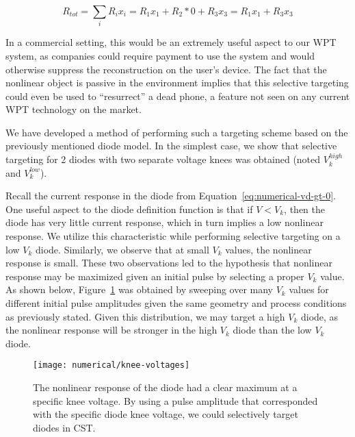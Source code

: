 \begin{equation}
R_{tot} = \sum_{i}R_{i}x_{i} = R_{1}x_{1} + R_{2}*0 + R_{3}x_{3} = R_{1}x_{1} + R_{3}x_{3}
\label{eq:numerical-r-tot-2}
\end{equation}

In a commercial setting, this would be an extremely useful aspect to our WPT system, as companies could require payment to use the system and would otherwise suppress the reconstruction on the user's device. The fact that the nonlinear object is passive in the environment implies that this selective targeting could even be used to ``resurrect'' a dead phone, a feature not seen on any current WPT technology on the market.

We have developed a method of performing such a targeting scheme based on the previously mentioned diode model. In the simplest case, we show that selective targeting for 2 diodes with two separate voltage knees was obtained (noted $V_k^{high}$ and $V_k^{low}$).

Recall the current response in the diode from Equation~\ref{eq:numerical-vd-gt-0}. One useful aspect to the diode definition function is that if $V < V_{k}$, then the diode has very little current response, which in turn implies a low nonlinear response. We utilize this characteristic while performing selective targeting on a low $V_{k}$ diode. Similarly, we observe that at small $V_{k}$ values, the nonlinear response is small. These two observations led to the hypothesis that nonlinear response may be maximized given an initial pulse by selecting a proper $V_{k}$ value. As shown below, Figure~\ref{fig:numerical-knee-voltages} was obtained by sweeping over many $V_{k}$ values for different initial pulse amplitudes given the same geometry and process conditions as previously stated. Given this distribution, we may target a high $V_{k}$ diode, as the nonlinear response will be stronger in the high $V_{k}$ diode than the low $V_{k}$ diode.

\begin{figure}[t]
\centering
\texttt{[image: numerical/knee-voltages]}
\caption[Nonlinear response due to different diode characteristics]{The nonlinear response of the diode had a clear maximum at a specific knee voltage. By using a pulse amplitude that corresponded with the specific diode knee voltage, we could selectively target diodes in CST.}
\label{fig:numerical-knee-voltages}
\end{figure}


